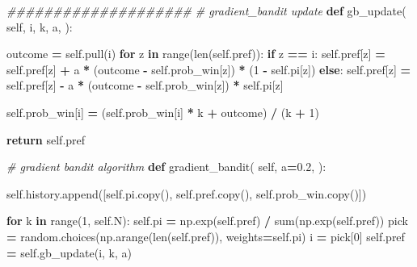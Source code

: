 \documentclass[
]{book}
\newenvironment{Shaded}{\begin{snugshade}}{\end{snugshade}}
\newcommand{\BuiltInTok}[1]{#1}
\newcommand{\CommentTok}[1]{\textcolor[rgb]{0.56,0.35,0.01}{\textit{#1}}}
\newcommand{\ControlFlowTok}[1]{\textcolor[rgb]{0.13,0.29,0.53}{\textbf{#1}}}
\newcommand{\DecValTok}[1]{\textcolor[rgb]{0.00,0.00,0.81}{#1}}
\newcommand{\FloatTok}[1]{\textcolor[rgb]{0.00,0.00,0.81}{#1}}
\newcommand{\KeywordTok}[1]{\textcolor[rgb]{0.13,0.29,0.53}{\textbf{#1}}}
\newcommand{\NormalTok}[1]{#1}
\newcommand{\OperatorTok}[1]{\textcolor[rgb]{0.81,0.36,0.00}{\textbf{#1}}}
\newcommand{\VariableTok}[1]{\textcolor[rgb]{0.00,0.00,0.00}{#1}}
\theoremstyle{definition}
\theoremstyle{definition}
\theoremstyle{definition}
\theoremstyle{definition}
\theoremstyle{remark}
\begin{document}
\begin{Shaded}
\begin{Highlighting}[]
    \CommentTok{\#\#\#\#\#\#\#\#\#\#\#\#\#\#\#\#\#\#\#\#}
    \CommentTok{\# gradient\_bandit update}
    \KeywordTok{def}\NormalTok{ gb\_update(}
            \VariableTok{self}\NormalTok{,}
\NormalTok{            i,}
\NormalTok{            k,}
\NormalTok{            a,}
\NormalTok{    ):}

\NormalTok{        outcome }\OperatorTok{=} \VariableTok{self}\NormalTok{.pull(i)}
        \ControlFlowTok{for}\NormalTok{ z }\KeywordTok{in} \BuiltInTok{range}\NormalTok{(}\BuiltInTok{len}\NormalTok{(}\VariableTok{self}\NormalTok{.pref)):}
            \ControlFlowTok{if}\NormalTok{ z }\OperatorTok{==}\NormalTok{ i:}
                \VariableTok{self}\NormalTok{.pref[z] }\OperatorTok{=} \VariableTok{self}\NormalTok{.pref[z] }\OperatorTok{+}\NormalTok{ a }\OperatorTok{*}\NormalTok{ (outcome }\OperatorTok{{-}} \VariableTok{self}\NormalTok{.prob\_win[z]) }\OperatorTok{*}\NormalTok{ (}\DecValTok{1} \OperatorTok{{-}} \VariableTok{self}\NormalTok{.pi[z])}
            \ControlFlowTok{else}\NormalTok{:}
                \VariableTok{self}\NormalTok{.pref[z] }\OperatorTok{=} \VariableTok{self}\NormalTok{.pref[z] }\OperatorTok{{-}}\NormalTok{ a }\OperatorTok{*}\NormalTok{ (outcome }\OperatorTok{{-}} \VariableTok{self}\NormalTok{.prob\_win[z]) }\OperatorTok{*} \VariableTok{self}\NormalTok{.pi[z]}

        \VariableTok{self}\NormalTok{.prob\_win[i] }\OperatorTok{=}\NormalTok{ (}\VariableTok{self}\NormalTok{.prob\_win[i] }\OperatorTok{*}\NormalTok{ k }\OperatorTok{+}\NormalTok{ outcome) }\OperatorTok{/}\NormalTok{ (k }\OperatorTok{+} \DecValTok{1}\NormalTok{)}

        \ControlFlowTok{return} \VariableTok{self}\NormalTok{.pref}

    \CommentTok{\# gradient bandit algorithm}
    \KeywordTok{def}\NormalTok{ gradient\_bandit(}
            \VariableTok{self}\NormalTok{,}
\NormalTok{            a}\OperatorTok{=}\FloatTok{0.2}\NormalTok{,}
\NormalTok{    ):}

        \VariableTok{self}\NormalTok{.history.append([}\VariableTok{self}\NormalTok{.pi.copy(),}
                             \VariableTok{self}\NormalTok{.pref.copy(),}
                             \VariableTok{self}\NormalTok{.prob\_win.copy()])}

        \ControlFlowTok{for}\NormalTok{ k }\KeywordTok{in} \BuiltInTok{range}\NormalTok{(}\DecValTok{1}\NormalTok{, }\VariableTok{self}\NormalTok{.N):}
            \VariableTok{self}\NormalTok{.pi }\OperatorTok{=}\NormalTok{ np.exp(}\VariableTok{self}\NormalTok{.pref) }\OperatorTok{/} \BuiltInTok{sum}\NormalTok{(np.exp(}\VariableTok{self}\NormalTok{.pref))}
\NormalTok{            pick }\OperatorTok{=}\NormalTok{ random.choices(np.arange(}\BuiltInTok{len}\NormalTok{(}\VariableTok{self}\NormalTok{.pref)), weights}\OperatorTok{=}\VariableTok{self}\NormalTok{.pi)}
\NormalTok{            i }\OperatorTok{=}\NormalTok{ pick[}\DecValTok{0}\NormalTok{]}
            \VariableTok{self}\NormalTok{.pref }\OperatorTok{=} \VariableTok{self}\NormalTok{.gb\_update(i, k, a)}


\end{Highlighting}
\end{Shaded}
\end{document}
